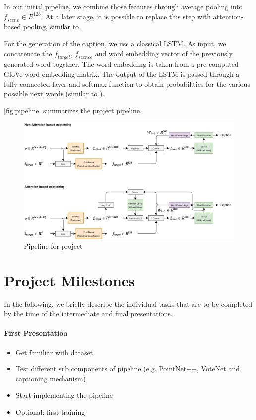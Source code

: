 \documentclass[10pt,twocolumn,letterpaper]{article}
\begin{document}
In our initial pipeline, we combine those features through average pooling into $\mathit{f_{scene}}\in R^{128}$. At a later stage, it is possible to replace this step with attention-based pooling, similar to \cite{anderson2018bottom}.

For the generation of the caption, we use a classical LSTM. As input, we concatenate the $\mathit{f_{target}}$, $\mathit{f_{scence}}$ and word embedding vector of the previously generated word together. The word embedding is taken from a pre-computed GloVe \cite{pennington2014glove} word embedding matrix. The output of the LSTM is passed through a fully-connected layer and softmax function to obtain probabilities for the various possible next words (similar to \cite{xu2015show}).

\autoref{fig:pipeline} summarizes the project pipeline.

\begin{figure}
	\centering
	\includegraphics[width=\textwidth]{figures/pipeline_sketch.pdf}
	\caption{Pipeline for project}
	\label{fig:pipeline}
\end{figure}

\section{Project Milestones}
In the following, we briefly describe the individual tasks that are to be completed by the time of the intermediate and final presentations.



\paragraph{First Presentation}
\begin{itemize}
	\setlength\itemsep{0em}
	\item Get familiar with dataset
	\item Test different sub components of pipeline (e.g. PointNet++, VoteNet and captioning mechanism)
	\item Start implementing the pipeline
	\item Optional: first training
\end{itemize}
\end{document}
